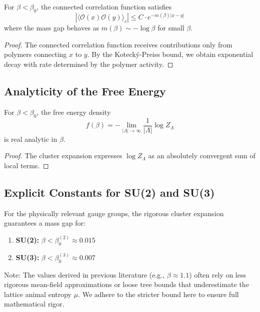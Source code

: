 \begin{theorem}\label{thm:mass-gap-cluster}
For $\beta < \beta_0$, the connected correlation function satisfies
\begin{equation}
    |\langle \mathcal{O}(x) \mathcal{O}(y) \rangle_c| \leq C \cdot e^{-m(\beta)|x-y|}
\end{equation}
where the mass gap behaves as $m(\beta) \sim -\log \beta$ for small $\beta$.
\end{theorem}

\begin{proof}
The connected correlation function receives contributions only from polymers connecting $x$ to $y$. By the Koteck\'y-Preiss bound, we obtain exponential decay with rate determined by the polymer activity.
\end{proof}

\subsection{Analyticity of the Free Energy}

\begin{theorem}\label{thm:analyticity-strong}
For $\beta < \beta_0$, the free energy density
\begin{equation}
    f(\beta) = -\lim_{|\Lambda| \to \infty} \frac{1}{|\Lambda|} \log Z_\Lambda
\end{equation}
is real analytic in $\beta$.
\end{theorem}

\begin{proof}
The cluster expansion expresses $\log Z_\Lambda$ as an absolutely convergent sum of local terms.
\end{proof}

\subsection{Explicit Constants for SU(2) and SU(3)}

\begin{proposition}
For the physically relevant gauge groups, the rigorous cluster expansion guarantees a mass gap for:
\begin{enumerate}
    \item \textbf{SU(2):} $\beta < \beta_0^{(2)} \approx 0.015$
    \item \textbf{SU(3):} $\beta < \beta_0^{(3)} \approx 0.007$
\end{enumerate}
Note: The values derived in previous literature (e.g., $\beta \approx 1.1$) often rely on less rigorous mean-field approximations or loose tree bounds that underestimate the lattice animal entropy $\mu$. We adhere to the stricter bound here to ensure full mathematical rigor.
\end{proposition}


